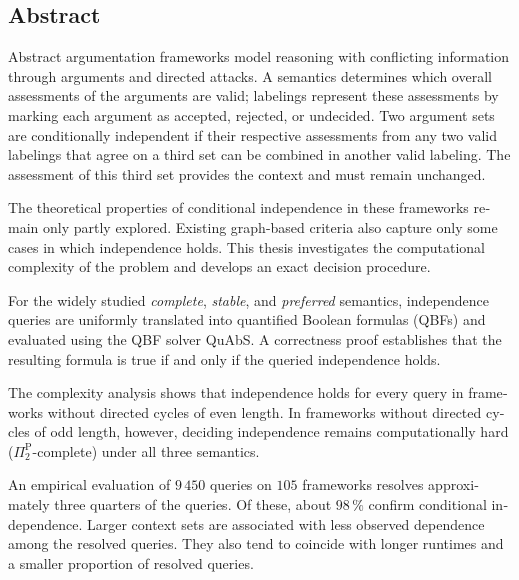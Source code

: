 
\begin{otherlanguage}{american}
    \chapter*{Abstract}

    Abstract argumentation frameworks model reasoning with conflicting
    information through arguments and directed attacks. A semantics
    determines which overall assessments of the arguments are valid;
    labelings represent these assessments by marking each argument as
    accepted, rejected, or undecided. Two argument sets are conditionally
    independent if their respective assessments from any two valid
    labelings that agree on a third set can be combined in another valid
    labeling. The assessment of this third set provides the context and
    must remain unchanged.

    The theoretical properties of conditional independence in these
    frameworks remain only partly explored. Existing graph-based criteria
    also capture only some cases in which independence holds. This thesis
    investigates the computational complexity of the problem and develops
    an exact decision procedure.

    For the widely studied \emph{complete}, \emph{stable}, and
    \emph{preferred} semantics, independence queries are uniformly
    translated into quantified Boolean formulas (QBFs) and evaluated using
    the QBF solver QuAbS. A correctness proof establishes that the resulting
    formula is true if and only if the queried independence holds.

    The complexity analysis shows that independence holds for every query
    in frameworks without directed cycles of even length. In frameworks
    without directed cycles of odd length, however, deciding independence
    remains computationally hard (\(\Pi_2^{\mathrm{P}}\)-complete) under all
    three semantics.

    An empirical evaluation of \(9\,450\) queries on \(105\) frameworks
    resolves approximately three quarters of the queries. Of these, about
    \(98\,\%\) confirm conditional independence. Larger context sets are
    associated with less observed dependence among the resolved queries.
    They also tend to coincide with longer runtimes and a smaller proportion
    of resolved queries.
\end{otherlanguage}
